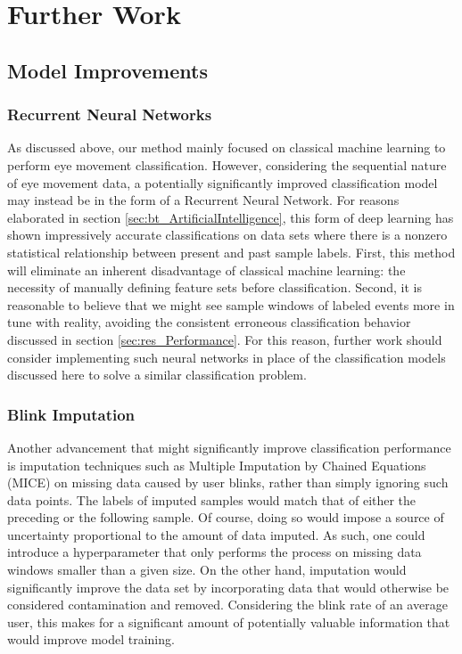 \section{Further Work}

\subsection{Model Improvements}

\subsubsection{Recurrent Neural Networks}

As discussed above, our method mainly focused on classical machine learning to perform eye movement classification. However, considering the sequential nature of eye movement data, a potentially significantly improved classification model may instead be in the form of a Recurrent Neural Network. For reasons elaborated in section \ref{sec:bt_ArtificialIntelligence}, this form of deep learning has shown impressively accurate classifications on data sets where there is a nonzero statistical relationship between present and past sample labels. First, this method will eliminate an inherent disadvantage of classical machine learning: the necessity of manually defining feature sets before classification. Second, it is reasonable to believe that we might see sample windows of labeled events more in tune with reality, avoiding the consistent erroneous classification behavior discussed in section \ref{sec:res_Performance}. For this reason, further work should consider implementing such neural networks in place of the classification models discussed here to solve a similar classification problem.

\subsubsection{Blink Imputation}

Another advancement that might significantly improve classification performance is imputation techniques such as Multiple Imputation by Chained Equations (MICE) on missing data caused by user blinks, rather than simply ignoring such data points. The labels of imputed samples would match that of either the preceding or the following sample. Of course, doing so would impose a source of uncertainty proportional to the amount of data imputed. As such, one could introduce a hyperparameter that only performs the process on missing data windows smaller than a given size. On the other hand, imputation would significantly improve the data set by incorporating data that would otherwise be considered contamination and removed. Considering the blink rate of an average user, this makes for a significant amount of potentially valuable information that would improve model training. 

